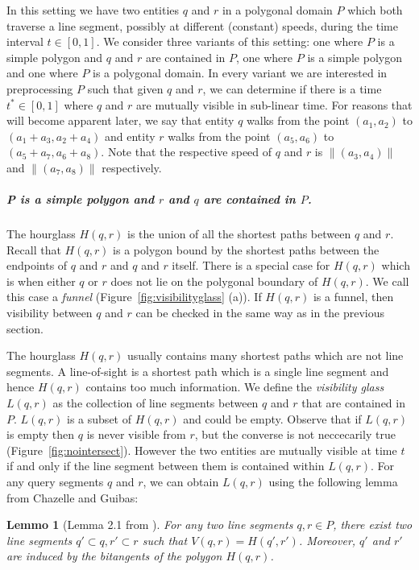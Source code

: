 \documentclass[a4paper, UKenglish]{paper}
\newtheorem{lemma}{Lemmo}
\begin{document}
In this setting we have two entities $q$ and $r$ in a polygonal domain $P$ which both traverse a line segment, possibly at different (constant) speeds, during the time interval $t \in [0,1]$. We consider three variants of this setting: one where $P$ is a simple polygon and $q$ and $r$ are contained in $P$, one where $P$ is a simple polygon and one where $P$ is a polygonal domain. In every variant we are interested in preprocessing $P$ such that given $q$ and $r$, we can determine if there is a time $t^* \in [0,1]$ where $q$ and $r$ are mutually visible in sub-linear time. For reasons that will become apparent later, we say that entity $q$ walks from the point $(a_1, a_2)$ to $(a_1 + a_3, a_2 + a_4)$ and entity $r$ walks from the point $(a_5, a_6)$ to $(a_5 + a_7, a_6 + a_8)$. Note that the respective speed of $q$ and $r$ is $\lVert (a_3, a_4) \rVert$ and $\lVert (a_7, a_8) \rVert$ respectively.

\subparagraph{P is a simple polygon and $r$ and $q$ are contained in $P$.}
The hourglass $H(q, r)$ is the union of all the shortest paths between $q$ and $r$. 
Recall that $H(q,r)$ is a polygon bound by the shortest paths between the endpoints of $q$ and $r$ and $q$ and $r$ itself. There is a special case for $H(q,r)$ which is when either $q$ or $r$ does not lie on the polygonal boundary of $H(q,r)$. We call this case a \emph{funnel} (Figure~\ref{fig:visibilityglass} (a)). If $H(q,r)$ is a funnel, then visibility between $q$ and $r$ can be checked in the same way as in the previous section.

The hourglass $H(q, r)$ usually contains many shortest paths which are not line segments. A line-of-sight is a shortest path which is a single line segment and hence $H(q,r)$ contains too much information. We define the \emph{visibility glass} $L(q,r)$ as the collection of line segments between $q$ and $r$ that are contained in $P$. $L(q,r)$ is a subset of $H(q,r)$ and could be empty. Observe that if $L(q,r)$ is empty then $q$ is never visible from $r$, but the converse is not neccecarily true (Figure~\ref{fig:nointersect}). However the two entities are mutually visible at time $t$ if and only if the line segment between them is contained within $L(q,r)$. For any query segments $q$ and $r$, we can obtain $L(q,r)$ using the following lemma from Chazelle and Guibas:

\begin{lemma}[Lemma 2.1 from \cite{Chazelle1989}]
For any two line segments $q, r \in P$, there exist two line segments $q' \subset q, r' \subset r$ such that $V(q, r) = H(q', r')$. Moreover, $q'$ and $r'$ are induced by the bitangents of the polygon $H(q, r)$.
\end{lemma}
\end{document}
